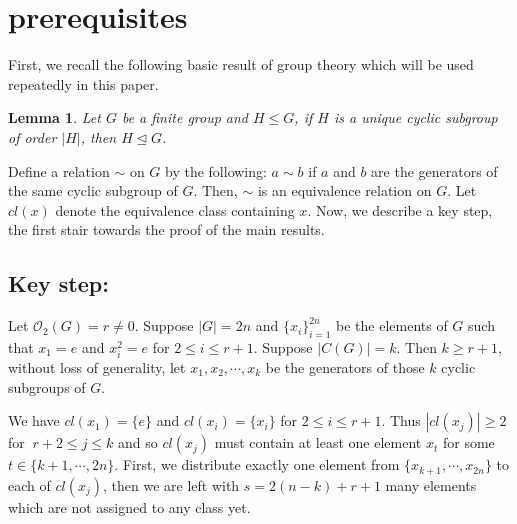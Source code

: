 \documentclass[a4paper,11pt]{amsart}
\numberwithin{equation}{section}
\numberwithin{equation}{subsection}
\newtheorem{lemma}[theorem]{Lemma}
\begin{document}
\section{prerequisites}

 First, we recall the following basic result of group theory which will be used repeatedly in this paper.
\begin{lemma}\label{normal}
    Let $G$ be a finite group and $H\leq G$, if $H$ is a unique cyclic subgroup of order $|H|$, then $H\trianglelefteq G$. 
\end{lemma}

Define a relation $\sim$ on $G$ by the following:  $a \sim b$ if $a$ and $b$ are the generators of the same cyclic subgroup of $G$. Then, $\sim$ is an equivalence relation on $G$. Let $cl(x)$ denote the equivalence class containing $x$. Now, we describe a key step, the first stair towards the proof of the main results.
\subsection{\textbf{Key step:}}\label{keystep} Let $\mathcal{O}_{2}(G)=r \neq 0$. 
Suppose $|G|=2n$ and $\{x_i\}_{i=1}^{2n}$ be the elements of $G$ such that $x_1 = e$ and $x_i^2 = e$ for $2 \leq i \leq r+1$.
Suppose $|C(G)|=k$. Then $k \geq r+1$, without loss of generality, let $x_1, x_2, \cdots,x_k$ be the generators of those $k$ cyclic subgroups of $G$.

We have $cl(x_1) = \{e\}$ and $cl(x_i) = \{x_i\}$ for $2 \leq i \leq r+1$.
Thus $|cl(x_j)| \geq 2~ $ for  $~r+2\leq j \leq k $ and so $cl(x_j)$ must contain at least one element $x_t$ for some $t\in \{k+1, \cdots, 2n\}$. 
First, we distribute exactly one element from $\{x_{k+1}, \cdots, x_{2n}\}$ to each of $cl(x_j)$, then we are left with $s=2(n-k)+r+1$ many elements which are not assigned to any class yet.
\end{document}
